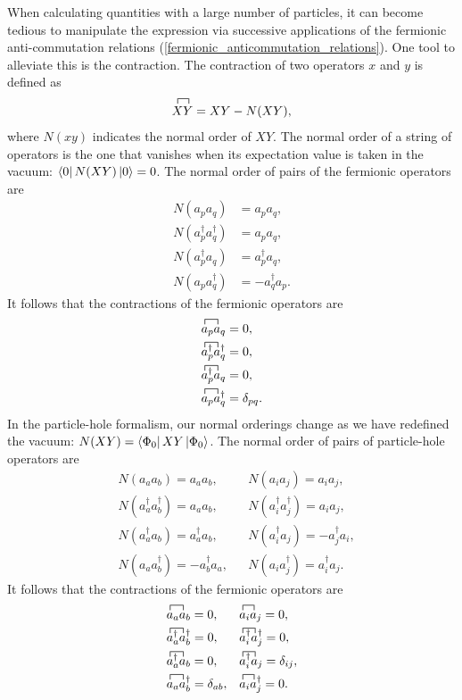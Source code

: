 \documentclass[10pt]{article}
\begin{document}
When calculating quantities with a large number of particles, it can become tedious to manipulate the expression via successive applications of the fermionic anti-commutation relations (\ref{fermionic_anticommutation_relations}). One tool to alleviate this is the contraction. The contraction of two operators $x$ and $y$ is defined as
\begin{align}
\contraction{}{X}{}{Y}XY = XY-N(XY),
\end{align}
where $N(xy)$ indicates the normal order of $XY$. The normal order of a string of operators is the one that vanishes when its expectation value is taken in the vacuum: $\bra{0}N(XY)\ket{0}=0$. The normal order of pairs of the fermionic operators are 
\begin{align}
N(a_pa_q)&=a_pa_q,
\\
N(a^\dagger_pa^\dagger_q)&=a_pa_q,
\\
N(a^\dagger_pa_q)&=a^\dagger_pa_q,
\\
N(a_pa^\dagger_q)&=-a^\dagger_qa_p.
\end{align}
It follows that the contractions of the fermionic operators are
\begin{align}
\contraction{}{a}{_p}{a}a_pa_q
&=
0,
\\
\contraction{}{a}{^\dagger_p}{a}a^\dagger_pa^\dagger_q
&=
0,
\\
\contraction{}{a}{^\dagger_p}{a}a^\dagger_pa_q
&=
0,
\\
\contraction{}{a}{_p}{a}a_pa^\dagger_q
&=
\delta_{pq}.
\end{align}
In the particle-hole formalism, our normal orderings change as we have redefined the vacuum: $N(XY)=\bra{\Phi_0}XY\ket{\Phi_0}$. The normal order of pairs of particle-hole operators are
\begin{align}
&N(a_aa_b)=a_aa_b, 
&&N(a_ia_j)=a_ia_j,
\\
&N(a^\dagger_aa^\dagger_b)=a_aa_b, &&N(a^\dagger_ia^\dagger_j)=a_ia_j,
\\
&N(a^\dagger_aa_b)=a^\dagger_aa_b, &&N(a^\dagger_ia_j)=-a^\dagger_ja_i,
\\
&N(a_aa^\dagger_b)=-a^\dagger_ba_a, &&N(a_ia^\dagger_j)=a^\dagger_ia_j.
\end{align}
It follows that the contractions of the fermionic operators are
\begin{align}
&
\contraction{}{a}{_a}{a}a_aa_b
=
0,
&&
\contraction{}{a}{_i}{a}a_ia_j
=
0,
\\
&
\contraction{}{a}{^\dagger_a}{a}a^\dagger_aa^\dagger_b
=
0,
&&
\contraction{}{a}{^\dagger_i}{a}a^\dagger_ia^\dagger_j
=
0,
\\
&
\contraction{}{a}{^\dagger_a}{a}a^\dagger_aa_b
=
0,
&&
\contraction{}{a}{^\dagger_i}{a}a^\dagger_ia_j
=
\delta_{ij},
\\
&
\contraction{}{a}{_a}{a}a_aa^\dagger_b
=
\delta_{ab},
&&
\contraction{}{a}{_i}{a}a_ia^\dagger_j
=
0.
\end{align}
\end{document}

